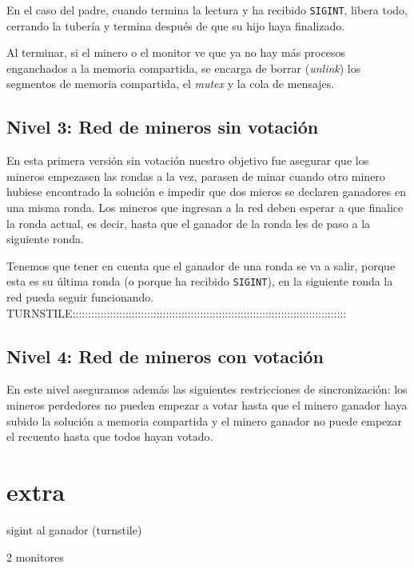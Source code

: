 \documentclass{article}
\begin{document}
    En el caso del padre, cuando termina la lectura y ha recibido \texttt{SIGINT}, libera todo, cerrando la tubería y termina después de que su hijo haya finalizado.

    Al terminar, si el minero o el monitor ve que ya no hay más procesos enganchados a la memoria compartida, se encarga de borrar (\emph{unlink}) los segmentos de memoria compartida, el \emph{mutex} y la cola de mensajes.

\subsection*{Nivel 3: Red de mineros sin votación}

En esta primera versión sin votación nuestro objetivo fue asegurar que los mineros empezasen las rondas a la vez, parasen de minar cuando otro minero hubiese encontrado la solución e impedir que dos mieros se declaren ganadores en una misma ronda. Los mineros que ingresan a la red deben esperar a que finalice la ronda actual, es decir, hasta que el ganador de la ronda les de paso a la siguiente ronda.

Tenemos que tener en cuenta que el ganador de una ronda se va a salir, porque esta es su última ronda (o porque ha recibido \texttt{SIGINT}), en la siguiente ronda la red pueda seguir funcionando. 
TURNSTILE:::::::::::::::::::::::::::::::::::::::::::::::::::::::::::::::::::::::::::::::::::::::: 


\subsection*{Nivel 4: Red de mineros con votación}

En este nivel aseguramos además las siguientes restricciones de sincronización: los mineros perdedores no pueden empezar a votar hasta que el minero ganador haya subido la solución a memoria compartida y el minero ganador no puede empezar el recuento hasta que todos hayan votado.


\section*{extra}
sigint al ganador (turnstile)

2 monitores
\end{document}
